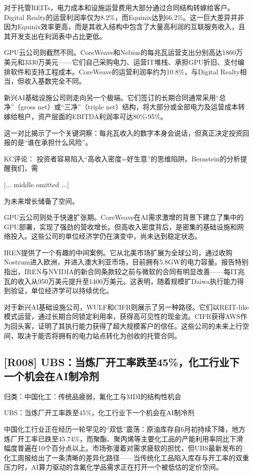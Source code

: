 \documentclass[11pt]{ctexart}
\begin{document}
对于托管REITs，电力成本和设施运营费用大部分通过合同结构转嫁给客户。Digital Realty的运营利润率仅为8.2\%，而Equinix达到66.2\%。这一巨大差异并非因为Equinix效率更高，而是其收入结构中包含了大量高利润的互联服务收入，且其开发支出在利润表中占比更低。

GPU云公司则截然不同。CoreWeave和Nebius的每兆瓦运营支出分别高达1860万美元和3330万美元——它们自己采购电力、运营IT堆栈、承担GPU折旧、支付编排软件和支持工程成本。CoreWeave的运营利润率约为10.8\%，与Digital Realty相当，但收入基数完全不同。

新兴AI基础设施公司则走向另一个极端。它们签订的长期合同通常采用“总净”（gross net）或“三净”（triple net）结构，将大部分或全部电力及运营成本转嫁给租户，资产层面的EBITDA利润率可达80\%-95\%。

这一对比揭示了一个关键洞察：每兆瓦收入的数字本身会说话，但真正决定投资回报的是“谁在承担什么风险”。

KC评论： 投资者容易陷入“高收入密度=好生意”的思维陷阱。Bernstein的分析提醒我们，需

[... middle omitted ...]

为未来增长储备了空间。

GPU云公司则处于快速扩张期。CoreWeave在AI需求激增的背景下建立了集中的GPU部署，实现了强劲的营收增长。但高收入密度背后，是密集的基础设施和网络投入。这些公司的单位经济学仍在演变中，尚未达到稳定状态。

IREN提供了一个有趣的中间案例。它从北美市场扩展为全球公司，通过收购Nostrum进入欧洲，并进入澳大利亚市场，目前拥有5.8GW的电力容量。报告特别指出，IREN与NVIDIA的新合同条款较之前与微软的合同有明显改善——每IT兆瓦的收入从950万美元提升至1400万美元。这表明，随着规模扩Daiwa执行能力得到验证，单位经济学可以持续优化。

对于新兴AI基础设施公司，WULF和CIFR则展示了另一种路径。它们以REIT-like模式运营，通过长期合同锁定利用率，获得高可见性的现金流。CIFR获得AWS作为回头客，证明了其执行能力获得了超大规模客户的信任。这些公司的未来上行空间，取决于能否将拥有的电力站点转化为创收的托管合同。

\subsection{[R008] UBS：当炼厂开工率跌至45\%，化工行业下一个机会在AI制冷剂}
{\small\color{refgray}归类：中国化工：传统品疲弱，氟化工与MDI的结构性机会}

UBS：当炼厂开工率跌至45\%，化工行业下一个机会在AI制冷剂

中国化工行业正在经历一轮罕见的“双低”震荡：原油库存自6月初持续下降，地方炼厂开工率已跌至45.74\%，而聚酯、聚丙烯等主要化工品的产能利用率同比下滑幅度普遍在10个百分点以上。市场弥漫着对需求疲软的担忧，但UBS最新发布的化工周报给出了一条清晰的差异化路径——当传统化工品陷入库存与开工率的双重压力时，AI算力驱动的含氟化学品需求正在打开一个被低估的定价空间。
\end{document}
